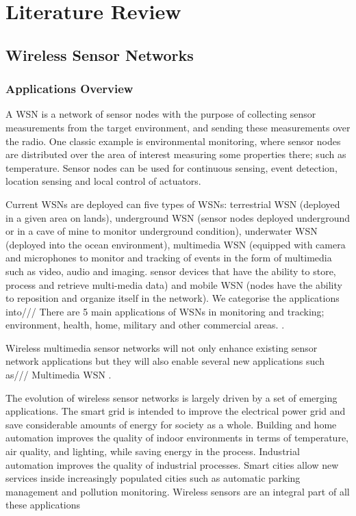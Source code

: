 \chapter{Literature Review}
\label{literatureReview}

\section{Wireless Sensor Networks}
\subsection{Applications Overview}
A WSN is a network of sensor nodes with the purpose of collecting sensor measurements from the target environment, and sending these measurements over the radio. One classic example is environmental monitoring, where sensor nodes are distributed over the area of interest measuring some properties there; such as temperature.
Sensor nodes can be used for continuous sensing, event detection, location sensing and local control of actuators. 

Current WSNs are deployed can five types of WSNs: terrestrial WSN (deployed in a given area on lands), underground WSN (sensor nodes deployed underground or in a cave of mine to monitor underground condition), underwater WSN (deployed into the ocean environment), multimedia WSN (equipped with camera and microphones to monitor and tracking of events in the form of multimedia such as video, audio and imaging. sensor devices that have the ability to store, process and retrieve multi-media data) and mobile WSN (nodes have the ability to reposition and organize itself in the network).\cite{wsnSurvey1}
We categorise the applications into///
There are 5 main applications of WSNs in monitoring and tracking; environment, health, home, military and other commercial areas. \cite{wsnSurvey2}.

Wireless multimedia sensor networks will not only enhance existing sensor network applications but they will also enable several new applications such as///
Multimedia WSN \cite{wsnSurvey3}.

The evolution of wireless sensor networks is largely driven by a set of emerging applications. The smart grid is intended to improve the electrical power grid and save considerable amounts of energy for society as a whole. Building and home automation improves the quality of indoor environments in terms of temperature, air quality, and lighting, while saving energy in the process. Industrial automation improves the quality of industrial processes. Smart cities allow new services inside increasingly populated cities such as automatic parking management and pollution monitoring. Wireless sensors are an integral part of all these applications \cite{beyondInteroperability}

